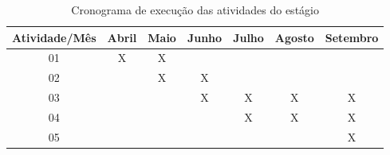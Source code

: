 \begin{table}[h]
  \caption{Cronograma de execução das atividades do estágio}
  \label{cronograma}
\centering
\begin{tabular}{|c|c|c|c|c|c|c|}
\hline
\textbf{Atividade/Mês} & \textbf{Abril} & \textbf{Maio} & \textbf{Junho} & \textbf{Julho} & \textbf{Agosto} & \textbf{Setembro} \\ \hline
01                     & X              & X             &                &                &                 &                   \\ \hline
02                     &                & X             & X              &                &                 &                   \\ \hline
03                     &                &               & X              & X              & X               & X                 \\ \hline
04                     &                &               &                & X              & X               & X                 \\ \hline
05                     &                &               &                &                &                 & X                 \\ \hline
\end{tabular}
\end{table}
